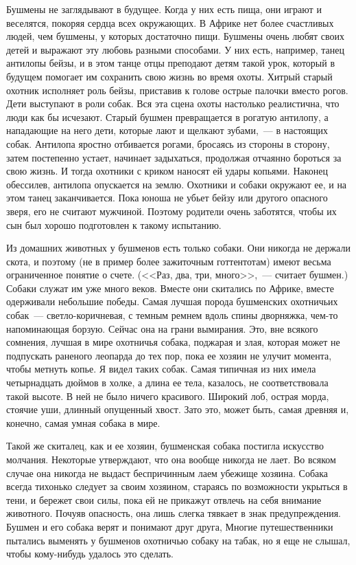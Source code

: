 \documentclass[12pt,a4paper,twoside,openany,svgnames]{memoir}
\begin{document}
Бушмены не заглядывают в будущее. Когда у них есть пища, они играют и веселятся, покоряя сердца всех окружающих. В Африке нет более счастливых людей, чем бушмены, у которых достаточно пищи. Бушмены очень любят своих детей и выражают эту любовь разными способами. У них есть, например, танец антилопы бейзы, и в этом танце отцы преподают детям такой урок, который в будущем помогает им сохранить свою жизнь во время охоты. Хитрый старый охотник исполняет роль бейзы, приставив к голове острые палочки вместо рогов. Дети выступают в роли собак. Вся эта сцена охоты настолько реалистична, что люди как бы исчезают. Старый бушмен превращается в рогатую антилопу, а нападающие на него дети, которые лают и щелкают зубами,~--- в настоящих собак. Антилопа яростно отбивается рогами, бросаясь из стороны в сторону, затем постепенно устает, начинает задыхаться, продолжая отчаянно бороться за свою жизнь. И тогда охотники с криком наносят ей удары копьями. Наконец обессилев, антилопа опускается на землю. Охотники и собаки окружают ее, и на этом танец заканчивается. Пока юноша не убьет бейзу или другого опасного зверя, его не считают мужчиной. Поэтому родители очень заботятся, чтобы их сын был хорошо подготовлен к такому испытанию.

Из домашних животных у бушменов есть только собаки. Они никогда не держали скота, и поэтому (не в пример более зажиточным готтентотам) имеют весьма ограниченное понятие о счете. (<<Раз, два, три, много>>,~--- считает бушмен.) Собаки служат им уже много веков. Вместе они скитались по Африке, вместе одерживали небольшие победы. Самая лучшая порода бушменских охотничьих собак~--- светло-коричневая, с темным ремнем вдоль спины дворняжка, чем-то напоминающая борзую. Сейчас она на грани вымирания. Это, вне всякого сомнения, лучшая в мире охотничья собака, поджарая и злая, которая может не подпускать раненого леопарда до тех пор, пока ее хозяин не улучит момента, чтобы метнуть копье. Я видел таких собак. Самая типичная из них имела четырнадцать дюймов в холке, а длина ее тела, казалось, не соответствовала такой высоте. В ней не было ничего красивого. Широкий лоб, острая морда, стоячие уши, длинный опущенный хвост. Зато это, может быть, самая древняя и, конечно, самая умная собака в мире.

Такой же скиталец, как и ее хозяин, бушменская собака постигла искусство молчания. Некоторые утверждают, что она вообще никогда не лает. Во всяком случае она никогда не выдаст беспричинным лаем убежище хозяина. Собака всегда тихонько следует за своим хозяином, стараясь по возможности укрыться в тени, и бережет свои силы, пока ей не прикажут отвлечь на себя внимание животного. Почуяв опасность, она лишь слегка тявкает в знак предупреждения. Бушмен и его собака верят и понимают друг друга, Многие путешественники пытались выменять у бушменов охотничью собаку на табак, но я еще не слышал, чтобы кому-нибудь удалось это сделать.
\end{document}
